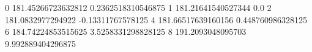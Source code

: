 0 181.45266723632812 0.2362518310546875
1 181.21641540527344 0.0
2 181.0832977294922 -0.13311767578125
4 181.66517639160156 0.448760986328125
6 184.74224853515625 3.5258331298828125
8 191.2093048095703 9.992889404296875
